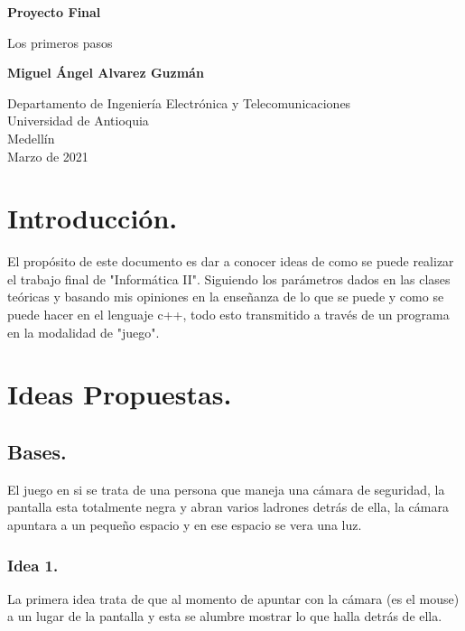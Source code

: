 \documentclass{article}
\begin{document}
\begin{titlepage}
    \begin{center}
        \vspace*{1cm}
            
        \Huge
        \textbf{Proyecto Final}
            
        \vspace{0.5cm}
        \LARGE
        Los primeros pasos
            
        \vspace{1.5cm}
            
        \textbf{Miguel Ángel Alvarez Guzmán}
            
        \vfill
            
        \vspace{0.8cm}
            
        \Large
        Departamento de Ingeniería Electrónica y Telecomunicaciones\\
        Universidad de Antioquia\\
        Medellín\\
        Marzo de 2021
            
    \end{center}
\end{titlepage}

\tableofcontents
\newpage
\section{Introducción.}\label{intro}
El propósito de este documento es dar a conocer ideas de como se puede realizar el trabajo final de "Informática II". Siguiendo los parámetros dados en las clases teóricas y basando mis opiniones en la enseñanza de lo que se puede y como se puede hacer en el lenguaje c++, todo esto transmitido a través de un programa en la modalidad de "juego".
\section{Ideas Propuestas.} \label{contenido}
\subsection{Bases.}
El juego en si se trata de una persona que maneja una cámara de seguridad, la pantalla esta totalmente negra y abran varios ladrones detrás de ella, la cámara apuntara a un pequeño espacio y en ese espacio se vera una luz.
\subsubsection{Idea 1.}
La primera idea trata de que al momento de apuntar con la cámara (es el mouse) a un lugar de la pantalla y esta se alumbre mostrar lo que halla detrás de ella.
\end{document}
